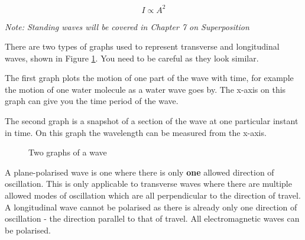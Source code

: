 \documentclass[main.tex]{subfiles}
\begin{document}
$$I \propto A^2$$


\emph{Note: Standing waves will be covered in Chapter 7 on Superposition}

There are two types of graphs used to represent transverse and longitudinal waves, shown in Figure \ref{twographs}. You need to be careful as they look similar.

The first graph plots the motion of one part of the wave with time, for example the motion of one water molecule as a water wave goes by. The x-axis on this graph can give you the time period of the wave.

The second graph is a snapshot of a section of the wave at one particular instant in time. On this graph the wavelength can be measured from the x-axis.

\begin{figure}[h]
    \begin{center}
    \end{center}
    \caption{Two graphs of a wave}
    \label{twographs}
\end{figure}
        
    


A plane-polarised wave is one where there is only \textbf{one} allowed direction of oscillation. This is only applicable to transverse waves where there are multiple allowed modes of oscillation which are all perpendicular to the direction of travel. A longitudinal wave cannot be polarised as there is already only one direction of oscillation - the direction parallel to that of travel. All electromagnetic waves can be polarised.
\end{document}
